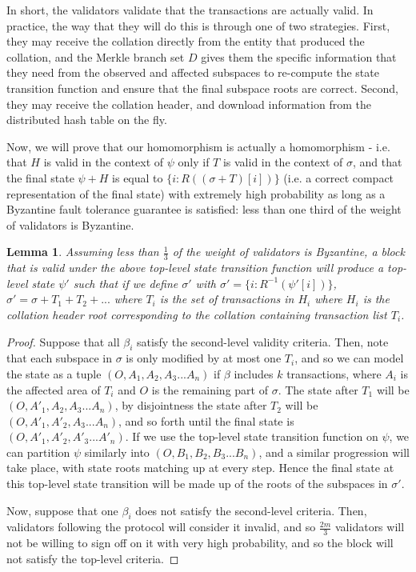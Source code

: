 \documentclass[11pt,a4paper]{article}
\makeatletter
\theoremstyle{plain}
\newtheorem{lem}[thm]{Lemma}
\theoremstyle{definition}
\theoremstyle{remark}
\newcommand{\ie}{i.e.\@\xspace}
\makeatother
\begin{document}
In short, the validators validate that the transactions are actually valid. In practice, the way that they will do this is through one of two strategies. First, they may receive the collation directly from the entity that produced the collation, and the Merkle branch set $D$ gives them the specific information that they need from the observed and affected subspaces to re-compute the state transition function and ensure that the final subspace roots are correct. Second, they may receive the collation header, and download information from the distributed hash table on the fly.

Now, we will prove that our homomorphism is actually a homomorphism - \ie that $H$ is valid in the context of $\psi$ only if $T$ is valid in the context of $\sigma$, and that the final state $\psi + H$ is equal to $\{i: R((\sigma + T)[i])\}$ (\ie a correct compact representation of the final state) with extremely high probability as long as a Byzantine fault tolerance guarantee is satisfied: less than one third of the weight of validators is Byzantine. 

\begin{lem}
Assuming less than $\frac{1}{3}$ of the weight of validators is Byzantine, a block that is valid under the above top-level state transition function will produce a top-level state $\psi'$ such that if we define $\sigma'$ with $\sigma' = \{i: R^{-1}(\psi'[i])\}$, $\sigma' = \sigma + T_1 + T_2 + ...$ where $T_i$ is the set of transactions in $H_i$ where $H_i$ is the collation header root corresponding to the collation containing transaction list $T_i$.
\end{lem}

\begin{proof}
Suppose that all $\beta_i$ satisfy the second-level validity criteria. Then, note that each subspace in $\sigma$ is only modified by at most one $T_i$, and so we can model the state as a tuple $(O, A_1, A_2, A_3 ... A_n)$ if $\beta$ includes $k$ transactions, where $A_i$ is the affected area of $T_i$ and $O$ is the remaining part of $\sigma$. The state after $T_1$ will be $(O, A'_1, A_2, A_3 ... A_n)$, by disjointness the state after $T_2$ will be $(O, A'_1, A'_2, A_3 ... A_n)$, and so forth until the final state is $(O, A'_1, A'_2, A'_3 ... A'_n)$. If we use the top-level state transition function on $\psi$, we can partition $\psi$ similarly into $(O, B_1, B_2, B_3 ... B_n)$, and a similar progression will take place, with state roots matching up at every step. Hence the final state at this top-level state transition will be made up of the roots of the subspaces in $\sigma'$.

Now, suppose that one $\beta_i$ does not satisfy the second-level criteria. Then, validators following the protocol will consider it invalid, and so $\frac{2m}{3}$ validators will not be willing to sign off on it with very high probability, and so the block will not satisfy the top-level criteria.
\end{proof}
\end{document}
